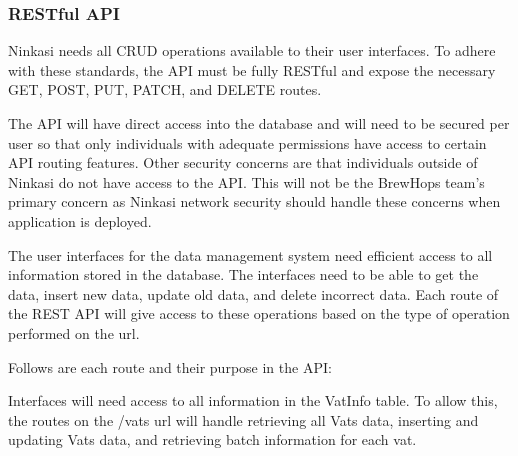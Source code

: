 \documentclass[draftclsnofoot,onecolumn,letterpaper,10pt]{IEEEtran}
\begin{document}
		\subsubsection{RESTful API}

		Ninkasi needs all CRUD operations available to their user interfaces.
		To adhere with these standards, the API must be fully RESTful and expose the necessary GET, POST, PUT, PATCH, and DELETE routes.


		The API will have direct access into the database and will need to be secured per user so that only individuals with adequate permissions have access to certain API routing features.
		Other security concerns are that individuals outside of Ninkasi do not have access to the API.
		This will not be the BrewHops team’s primary concern as Ninkasi network security should handle these concerns when application is deployed.


		The user interfaces for the data management system need efficient access to all information stored in the database.
		The interfaces need to be able to get the data, insert new data, update old data, and delete incorrect data.
		Each route of the REST API will give access to these operations based on the type of operation performed on the url.


		Follows are each route and their purpose in the API:


		Interfaces will need access to all information in the VatInfo table.
		To allow this, the routes on the /vats url will handle retrieving all Vats data, inserting and updating Vats data, and retrieving batch information for each vat.
\end{document}
